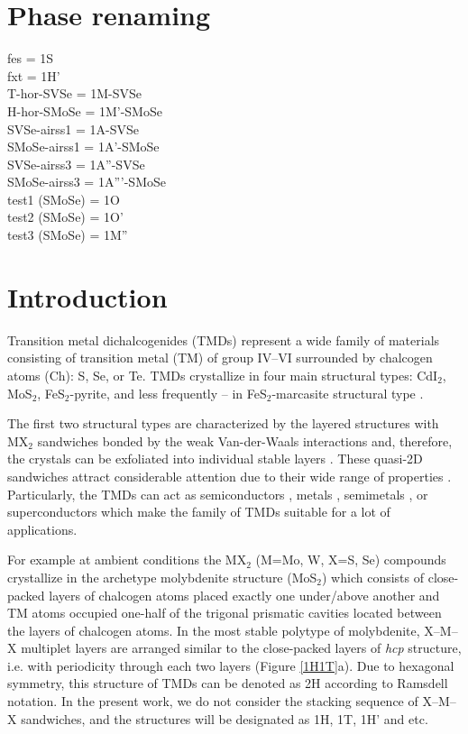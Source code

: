 \documentclass[a4paperm]{article}
\begin{document}
\section*{Phase renaming}
fes = 1S \\
fxt = 1H' \\
T-hor-SVSe = 1M-SVSe \\
H-hor-SMoSe = 1M'-SMoSe \\
SVSe-airss1 = 1A-SVSe \\
SMoSe-airss1 = 1A'-SMoSe \\
SVSe-airss3 = 1A''-SVSe \\
SMoSe-airss3 = 1A'''-SMoSe \\
test1 (SMoSe) = 1O \\
test2 (SMoSe) = 1O' \\
test3 (SMoSe) = 1M'' \\


\section{Introduction}

Transition metal dichalcogenides (TMDs) represent a wide family of materials consisting of transition metal (TM) of group IV--VI surrounded by chalcogen atoms (Ch): S, Se, or Te. 
TMDs crystallize in four main structural types: CdI$_2$, MoS$_2$, FeS$_2$-pyrite, and less frequently -- in FeS$_2$-marcasite structural type \cite{wells}.

The first two structural types are characterized by the layered structures with MX$_2$ sandwiches bonded by the weak Van-der-Waals interactions and, therefore, the crystals can be exfoliated into individual stable layers \cite{zhang2020intercalation}. These quasi-2D sandwiches attract considerable attention due to their wide range of properties \cite{li2017graphene, SHI20181, xi2016ising, hu2019recent, pi2019recent}. 
Particularly, the TMDs can act as semiconductors \cite{nayeri2018transport}, metals \cite{zhao20212d}, semimetals \cite{xu2020high, zhao2020observation}, or superconductors \cite{wang2020nodeless,hsu2017topological} which make the family of TMDs suitable for a lot of applications. 


For example at ambient conditions the MX$_2$ (M=Mo, W, X=S, Se) compounds crystallize in the archetype molybdenite structure (MoS$_2$) which consists of close-packed layers of chalcogen atoms placed exactly one under/above another and TM atoms occupied one-half of the trigonal prismatic cavities located between the layers of chalcogen atoms. 
In the most stable polytype of molybdenite, X--M--X multiplet layers are arranged similar to the close-packed layers of {\it hcp} structure, i.e. with periodicity through each two layers (Figure \ref{1H1T}a).
Due to hexagonal symmetry, this structure of TMDs can be denoted as 2H according to Ramsdell notation.
In the present work, we do not consider the stacking sequence of X--M--X sandwiches, and the structures will be designated as 1H, 1T, 1H' and etc.
\end{document}
